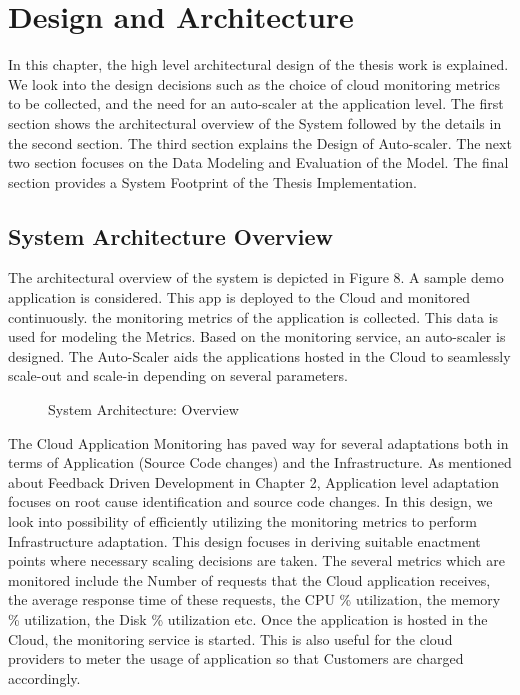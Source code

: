\documentclass[article,type=msc,colorback,12pt,accentcolor=tud7b]{tudthesis}
\begin{document}
 \cleardoublepage
 \section{Design and Architecture}	
 
	In this chapter, the high level architectural design of the thesis work is explained. We look into the design decisions such as the choice of cloud monitoring metrics to be collected, and the need for an auto-scaler at the application level. The first section shows the architectural overview of the System followed by the details in the second section. The third section explains the Design of Auto-scaler. The next two section focuses on the Data Modeling and Evaluation of the Model. The final section provides a System Footprint of the Thesis Implementation.
 
\subsection{System Architecture Overview} 

	The architectural overview of the system is depicted in Figure 8. A sample demo application is considered. This app is deployed to the Cloud and monitored continuously. the monitoring metrics of the application is collected. This data is used for modeling the Metrics. Based on the monitoring service, an auto-scaler is designed. The Auto-Scaler aids the applications hosted in the Cloud to seamlessly scale-out and scale-in depending on several parameters. 
	
		 \begin{figure}[!h]
		 	\begin{center}
		 		\makebox[\textwidth]{\texttt{[image: C1]}}
		 	\end{center}
		 	\caption{System Architecture: Overview}
		 \end{figure}
		 
	
	The Cloud Application Monitoring has paved way for several adaptations both in terms of Application (Source Code changes) and the Infrastructure. As mentioned about Feedback Driven Development in Chapter 2, Application level adaptation focuses on root cause identification and source code changes. In this design, we look into possibility of efficiently utilizing the monitoring metrics to perform Infrastructure adaptation.  This design focuses in deriving suitable enactment points where necessary scaling decisions are taken. The several metrics which are monitored include the Number of requests that the Cloud application receives, the average response time of these requests, the CPU \% utilization, the memory \% utilization, the Disk \% utilization etc. Once the application is hosted in the Cloud, the monitoring service is started. This is also useful for the cloud providers to meter the usage of application so that Customers are charged accordingly.
 
\end{document}
